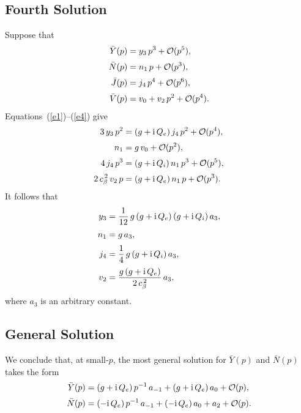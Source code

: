 \documentclass[12pt,prb,aps,notitlepage]{revtex4-1}
\begin{document}
\subsection{Fourth Solution}
Suppose that
\begin{align}
\bar{Y}(p) &= y_3\,p^3 +{ \cal O}(p^5),\\[0.5ex]
\bar{N}(p) &=n_1\,p + {\cal O}(p^3),\\[0.5ex]
\bar{J}(p) &= j_4\,p^4 + {\cal O}(p^6),\\[0.5ex]
\bar{V}(p) &= v_0 + v_2\,p^2 +{ \cal O}(p^4).
\end{align}
Equations~(\ref{e1})--(\ref{e4}) give 
\begin{align}
3\,y_3 \,p^2&= (g+{\rm i}\,Q_e)\,j_4\,p^2 + {\cal O}(p^4),\\[0.5ex]
n_1&= g\,v_0 +{\cal O}(p^2),\\[0.5ex]
4\,j_4\,p^3 &= (g+{\rm i}\,Q_i)\,n_1\,p^3 + {\cal O}(p^5),\\[0.5ex]
2\,c_\beta^{\,2}\,v_2\,p& = (g+{\rm i}\,Q_e)\,n_1\,p + {\cal O}(p^3).
\end{align}
It follows that 
\begin{align}
y_3& = \frac{1}{12}\,g\,(g+{\rm i}\,Q_e)\,(g+{\rm i}\,Q_i)\,a_3,\\[0.5ex]
n_1 &= g\,a_3,\\[0.5ex]
j_4 &= \frac{1}{4}\,g\,(g+{\rm i}\,Q_i)\,a_3,\\[0.5ex]
v_2 &= \frac{g\,(g+{\rm i}\,Q_e)}{2\,c_\beta^{\,2}}\,a_3,
\end{align}
where $a_3$ is an arbitrary constant. 

\subsection{General Solution}
We conclude that, at small-$p$, the most general solution for $\bar{Y}(p)$ and $\bar{N}(p)$ takes the form 
\begin{align}\label{yy}
\bar{Y}(p) &= (g+{\rm i}\,Q_e)\,p^{-1}\,a_{-1} +(g+{\rm i}\,Q_e) \,a_0+ {\cal O}(p),\\[0.5ex]
\bar{N}(p) &= (-{\rm i}\,Q_e)\,p^{-1}\,a_{-1} + (-{\rm i}\,Q_e)\,a_0 + a_2 + {\cal O}(p).\label{nn}
\end{align}
\end{document}
